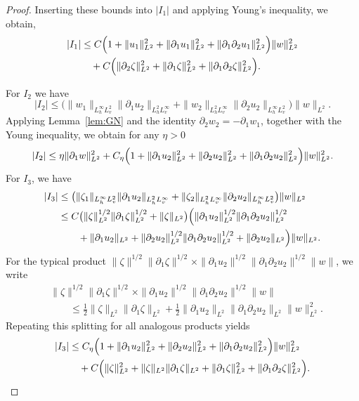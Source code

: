 \documentclass[10pt,a4paper]{amsart}
\begin{document}
\begin{proof}
Inserting these bounds into $|I_1|$ and applying Young's inequality, we obtain,
\begin{align}\label{est_I1}
  |I_1| &\le C \Bigl(1+\| u_1\|_{L^2}^2+\|\partial_1 u_1\|_{L^2}^2
          +\|\partial_1\partial_2 u_1\|_{L^2}^2\Bigr) \|w\|_{L^2}^2 \notag\\
  &\quad + C\Bigl(\|\partial_2\zeta\|_{L^2}^2
          + \|\partial_1\zeta\|_{L^2}^2 + \|\partial_1\partial_2\zeta\|_{L^2}^2\Bigr).
\end{align}


  For $I_2$ we have
  \[
    |I_2| \le \bigl(\|w_1\|_{L^\infty_h L^2_v}\|\partial_1 u_2\|_{L^2_h L^\infty_v}
          + \|w_2\|_{L^2_h L^\infty_v}\|\partial_2 u_2\|_{L^\infty_h L^2_v}\bigr) \|w\|_{L^2}.
  \]
  Applying Lemma~\ref{lem:GN} and the identity $\partial_2 w_2=-\partial_1 w_1$,
  together with the Young inequality, we obtain for any $\eta>0$
  \begin{equation}\label{est_I2}
    |I_2| \le \eta \|\partial_1 w\|_{L^2}^2
      + C_\eta \Bigl(1+\|\partial_1 u_2\|_{L^2}^2+\|\partial_2 u_2\|_{L^2}^2
        +\|\partial_1\partial_2 u_2\|_{L^2}^2\Bigr) \|w\|_{L^2}^2 .
  \end{equation}
  For $I_3$, we have
  \begin{align*}
    |I_3| &\le \bigl(\|\zeta_1\|_{L^\infty_h L^2_v}\|\partial_1 u_2\|_{L^2_h L^\infty_v}
          + \|\zeta_2\|_{L^2_h L^\infty_v}\|\partial_2 u_2\|_{L^\infty_h L^2_v}\bigr)
          \|w\|_{L^2} \\
    &\le C\bigl(\|\zeta\|_{L^2}^{1/2}\|\partial_1\zeta\|_{L^2}^{1/2}+\|\zeta\|_{L^2}\bigr)
      \Bigl(\|\partial_1 u_2\|_{L^2}^{1/2}\|\partial_1\partial_2 u_2\|_{L^2}^{1/2}\\
      &\qquad+\|\partial_1 u_2\|_{L^2}+\|\partial_2 u_2\|_{L^2}^{1/2}\|\partial_1\partial_2 u_2\|_{L^2}^{1/2}
          +\|\partial_2 u_2\|_{L^2}\Bigr) \|w\|_{L^2}.
  \end{align*}
   For the typical product
  $\|\zeta\|^{1/2}\|\partial_1\zeta\|^{1/2}
   \times \|\partial_1 u_2\|^{1/2}\|\partial_1\partial_2 u_2\|^{1/2} \|w\|$,
  we write
  \begin{align*}
   &\|\zeta\|^{1/2}\|\partial_1\zeta\|^{1/2}
   \times \|\partial_1 u_2\|^{1/2}\|\partial_1\partial_2 u_2\|^{1/2} \|w\|\\
   &\qquad \le \tfrac12 \|\zeta\|_{L^2}\|\partial_1\zeta\|_{L^2}
    + \tfrac12 \|\partial_1 u_2\|_{L^2}\|\partial_1\partial_2 u_2\|_{L^2} \|w\|_{L^2}^2 .
  \end{align*}
  Repeating this splitting for all analogous products yields
  \begin{align}\label{est_I3}
    |I_3| &\le C_\eta \Bigl(1+\|\partial_1 u_2\|_{L^2}^2+\|\partial_2 u_2\|_{L^2}^2
        +\|\partial_1\partial_2 u_2\|_{L^2}^2\Bigr) \|w\|_{L^2}^2 \notag\\
    &\quad + C\Bigl(\|\zeta\|_{L^2}^2 + \|\zeta\|_{L^2}\|\partial_1\zeta\|_{L^2}
        + \|\partial_1\zeta\|_{L^2}^2 + \|\partial_1\partial_2\zeta\|_{L^2}^2\Bigr).
  \end{align}







\end{proof}
\end{document}
